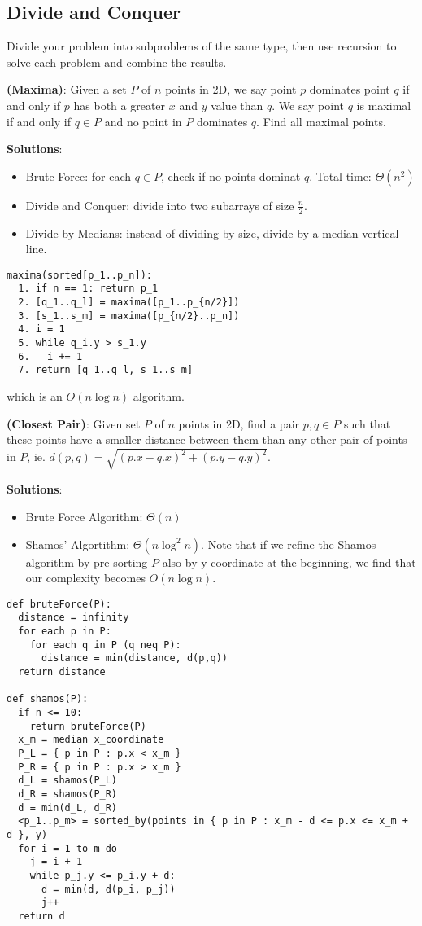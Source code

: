 \documentclass[12pt]{article}
\begin{document}
\subsection{Divide and Conquer}
Divide your problem into subproblems of the same type, then use recursion to solve each problem and combine the results.

\begin{example}
{\bf (Maxima)}: Given a set $P$ of $n$ points in 2D, we say point $p$ dominates point $q$ if and only if $p$ has both a greater $x$ and $y$ value than $q$. We say point $q$ is maximal if and only if $q \in P$ and no point in $P$ dominates $q$. Find all maximal points.

{\bf Solutions}:
\begin{itemize}
\item Brute Force: for each $q \in P$, check if no points dominat $q$. Total time: $\Theta(n^2)$
\item Divide and Conquer: divide into two subarrays of size $\frac{n}{2}$.
\item Divide by Medians: instead of dividing by size, divide by a median vertical line.
\end{itemize}

\begin{verbatim}
maxima(sorted[p_1..p_n]):
  1. if n == 1: return p_1
  2. [q_1..q_l] = maxima([p_1..p_{n/2}])
  3. [s_1..s_m] = maxima([p_{n/2}..p_n])
  4. i = 1
  5. while q_i.y > s_1.y
  6.   i += 1
  7. return [q_1..q_l, s_1..s_m]
\end{verbatim}
which is an $O(n\log n)$ algorithm.
\end{example}

\begin{example}
{\bf (Closest Pair)}: Given set $P$ of $n$ points in 2D, find a pair $p, q \in P$ such that these points have a smaller distance between them than any other pair of points in $P$, ie. $d(p,q) = \sqrt{(p.x - q.x)^2 + (p.y - q.y)^2}$.

{\bf Solutions}:
\begin{itemize}
\item Brute Force Algorithm: $\Theta(n)$
\item Shamos' Algortithm: $\Theta(n\log^2 n)$. Note that if we refine the Shamos algorithm by pre-sorting $P$ also by y-coordinate at the beginning, we find that our complexity becomes $O(n\log n)$.
\end{itemize}

\begin{verbatim}
def bruteForce(P):
  distance = infinity
  for each p in P:
    for each q in P (q neq P):
      distance = min(distance, d(p,q))
  return distance

def shamos(P):
  if n <= 10:
    return bruteForce(P)
  x_m = median x_coordinate
  P_L = { p in P : p.x < x_m }
  P_R = { p in P : p.x > x_m }
  d_L = shamos(P_L)
  d_R = shamos(P_R)
  d = min(d_L, d_R)
  <p_1..p_m> = sorted_by(points in { p in P : x_m - d <= p.x <= x_m + d }, y)
  for i = 1 to m do
    j = i + 1
    while p_j.y <= p_i.y + d:
      d = min(d, d(p_i, p_j))
      j++
  return d
\end{verbatim}
\end{example}
\end{document}

